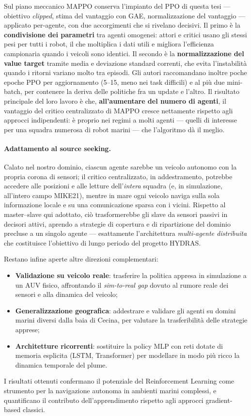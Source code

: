Sul piano meccanico MAPPO conserva l'impianto del PPO di questa tesi --- obiettivo
\emph{clipped}, stima del vantaggio con GAE, normalizzazione del vantaggio --- applicato
per-agente, con due accorgimenti che si rivelano decisivi. Il primo \`e la
\textbf{condivisione dei parametri} tra agenti omogenei: attori e critici usano gli stessi
pesi per tutti i robot, il che moltiplica i dati utili e migliora l'efficienza campionaria
quando i veicoli sono identici. Il secondo \`e la \textbf{normalizzazione del value target}
tramite media e deviazione standard correnti, che evita l'instabilit\`a quando i ritorni
variano molto tra episodi. Gli autori raccomandano inoltre poche epoche PPO per
aggiornamento (5--15, meno nei task difficili) e al pi\`u due mini-batch, per contenere la
deriva delle politiche fra un update e l'altro. Il risultato principale del loro lavoro \`e
che, \textbf{all'aumentare del numero di agenti}, il vantaggio del critico centralizzato di
MAPPO cresce nettamente rispetto agli approcci indipendenti: \`e proprio nei regimi a molti
agenti --- quelli di interesse per una squadra numerosa di robot marini --- che l'algoritmo
d\`a il meglio.

\paragraph{Adattamento al source seeking.} Calato nel nostro dominio, ciascun agente
sarebbe un veicolo autonomo con la propria corona di sensori; il critico centralizzato, in
addestramento, potrebbe accedere alle posizioni e alle letture dell'\emph{intera} squadra
(e, in simulazione, all'intero campo MIKE21), mentre in mare ogni veicolo naviga sulla sola
informazione locale e su una comunicazione sparsa con i vicini. Rispetto al master--slave
qui adottato, ci\`o trasformerebbe gli slave da sensori passivi in decisori attivi, aprendo
a strategie di copertura e di ripartizione del dominio precluse a un singolo agente ---
esattamente l'architettura \emph{multi-agente distribuita} che costituisce l'obiettivo di
lungo periodo del progetto HYDRAS.

\medskip
Restano infine aperte altre direzioni complementari:
\begin{itemize}
    \item \textbf{Validazione su veicolo reale}: trasferire la politica appresa in
          simulazione a un AUV fisico, affrontando il \emph{sim-to-real gap} dovuto al
          rumore reale dei sensori e alla dinamica del veicolo;
    \item \textbf{Generalizzazione geografica}: addestrare e validare gli agenti su
          domini marini diversi dalla baia di Cecina, per valutare la trasferibilit\`a
          delle strategie apprese;
    \item \textbf{Architetture ricorrenti}: sostituire la policy MLP con reti dotate di
          memoria esplicita (LSTM, Transformer) per modellare in modo pi\`u ricco la
          dinamica temporale del plume.
\end{itemize}

I risultati ottenuti confermano il potenziale del Reinforcement Learning come strumento
per la navigazione autonoma in ambienti marini complessi, e quantificano il contributo
dell'apprendimento rispetto agli approcci gradient-based classici.
